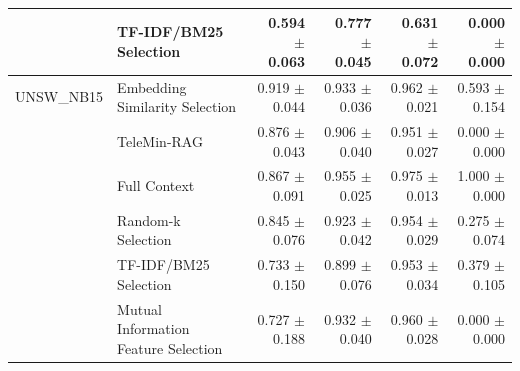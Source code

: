 \begin{tabular}{llrrrr}
 & TF-IDF/BM25 Selection & 0.594 $\pm$ 0.063 & 0.777 $\pm$ 0.045 & 0.631 $\pm$ 0.072 & 0.000 $\pm$ 0.000 \\
\midrule
UNSW_NB15 & Embedding Similarity Selection & 0.919 $\pm$ 0.044 & 0.933 $\pm$ 0.036 & 0.962 $\pm$ 0.021 & 0.593 $\pm$ 0.154 \\
 & TeleMin-RAG & 0.876 $\pm$ 0.043 & 0.906 $\pm$ 0.040 & 0.951 $\pm$ 0.027 & 0.000 $\pm$ 0.000 \\
 & Full Context & 0.867 $\pm$ 0.091 & 0.955 $\pm$ 0.025 & 0.975 $\pm$ 0.013 & 1.000 $\pm$ 0.000 \\
 & Random-k Selection & 0.845 $\pm$ 0.076 & 0.923 $\pm$ 0.042 & 0.954 $\pm$ 0.029 & 0.275 $\pm$ 0.074 \\
 & TF-IDF/BM25 Selection & 0.733 $\pm$ 0.150 & 0.899 $\pm$ 0.076 & 0.953 $\pm$ 0.034 & 0.379 $\pm$ 0.105 \\
 & Mutual Information Feature Selection & 0.727 $\pm$ 0.188 & 0.932 $\pm$ 0.040 & 0.960 $\pm$ 0.028 & 0.000 $\pm$ 0.000 \\
\bottomrule
\end{tabular}
